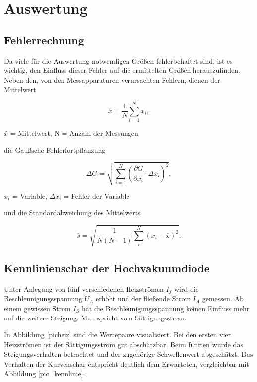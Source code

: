\section{Auswertung}
\subsection{Fehlerrechnung}
Da viele für die Auswertung notwendigen Größen fehlerbehaftet sind, ist es wichtig, den Einfluss dieser Fehler auf die ermittelten
Größen herauszufinden. Neben den, von den Messapparaturen verursachten Fehlern, dienen der Mittelwert
\begin{formel}
\begin{equation}
 \bar{x} = \frac1N \sum_{i=1}^{N} x_i,
\end{equation}
\caption*{\small{$\bar{x}$ = Mittelwert, N = Anzahl der Messungen}}
\end{formel}

die Gaußsche Fehlerfortpflanzung

\begin{formel}
\begin{equation}
\Delta G = \sqrt{\sum_{i=1}^{N}\left( \frac{\partial G}{\partial x_i}\cdot \Delta x_i\right)^2},
\label{gauss}
\end{equation}
\caption*{$x_i$ = Variable, $\Delta x_i$ = Fehler der Variable}
\end{formel}

und die Standardabweichung des Mittelwerts

\begin{equation}
 \bar s = \sqrt{\frac{1}{N(N-1)} \sum_{i}^{N} (x_i - \bar{x})^2}.
\end{equation}

\subsection{Kennlinienschar der Hochvakuumdiode}
\label{a}
Unter Anlegung von fünf verschiedenen Heizströmen $I_f$ wird die Beschleunigungsspannung $U_A$ erhöht und der fließende Strom $I_A$ 
gemessen. Ab einem gewissen Strom $I_S$ hat die Beschleunigungsspannung keinen Einfluss mehr auf die weitere Steigung. Man spricht vom
Sättigungsstrom.

In Abbildung \ref{picheiz} sind die Wertepaare visualisiert. Bei den ersten vier Heizströmen ist der Sättigungsstrom gut abschätzbar.
Beim fünften wurde das Steigungsverhalten betrachtet und der zugehörige Schwellenwert abgeschätzt. Das Verhalten der Kurvenschar 
entspricht deutlich dem Erwarteten, vergleichbar mit Abbildung \ref{pic_kennlinie}.

